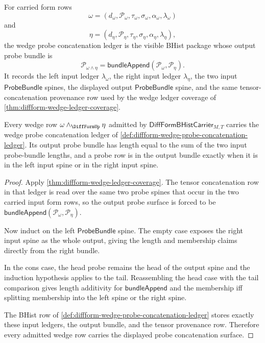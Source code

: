 \begin{definition}
\label{def:diffform-wedge-probe-concatenation-ledger}
For carried form rows
$$
\omega=(d_\omega,\mathcal{P}_\omega,\tau_\omega,\sigma_\omega,\alpha_\omega,\lambda_\omega)
$$
and
$$
\eta=(d_\eta,\mathcal{P}_\eta,\tau_\eta,\sigma_\eta,\alpha_\eta,\lambda_\eta),
$$
the wedge probe concatenation ledger is the visible BHist package whose output
probe bundle is
$$
\mathcal{P}_{\omega\wedge\eta}
=\mathsf{bundleAppend}(\mathcal{P}_\omega,\mathcal{P}_\eta).
$$
It records the left input ledger $\lambda_\omega$, the right input ledger
$\lambda_\eta$, the two input $\mathsf{ProbeBundle}$ spines, the displayed
output $\mathsf{ProbeBundle}$ spine, and the same tensor-concatenation
provenance row used by the wedge ledger coverage of
\autoref{thm:diffform-wedge-ledger-coverage}.
\end{definition}

\begin{theorem}
\label{thm:diffform-wedge-probe-concatenation-coverage}
Every wedge row $\omega\wedge_{\DiffFormUp}\eta$ admitted by
$\mathsf{DiffFormBHistCarrier}_{M,T}$ carries the wedge probe concatenation
ledger of \autoref{def:diffform-wedge-probe-concatenation-ledger}. Its output
probe bundle has length equal to the sum of the two input probe-bundle lengths,
and a probe row is in the output bundle exactly when it is in the left input
spine or in the right input spine.
\end{theorem}
\begin{proof}
Apply \autoref{thm:diffform-wedge-ledger-coverage}. The tensor concatenation
row in that ledger is read over the same two probe spines that occur in the
two carried input form rows, so the output probe surface is forced to be
$\mathsf{bundleAppend}(\mathcal{P}_\omega,\mathcal{P}_\eta)$.

Now induct on the left $\mathsf{ProbeBundle}$ spine. The empty case exposes
the right input spine as the whole output, giving the length and membership
claims directly from the right bundle.

In the cons case, the head probe remains the head of the output spine and the
induction hypothesis applies to the tail. Reassembling the head case with the
tail comparison gives length additivity for
$\mathsf{bundleAppend}$ and the membership iff splitting membership into the
left spine or the right spine.

The BHist row of
\autoref{def:diffform-wedge-probe-concatenation-ledger} stores exactly these
input ledgers, the output bundle, and the tensor provenance row. Therefore
every admitted wedge row carries the displayed probe concatenation surface.
\end{proof}

